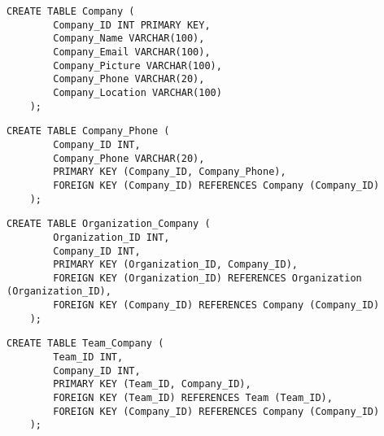     \begin{lstlisting}[caption={Create Company table}, label={lst:create_company}]
    CREATE TABLE Company (
        Company_ID INT PRIMARY KEY,
        Company_Name VARCHAR(100),
        Company_Email VARCHAR(100),
        Company_Picture VARCHAR(100),
        Company_Phone VARCHAR(20),
        Company_Location VARCHAR(100)
    );
    \end{lstlisting}
    
    \begin{lstlisting}[caption={Create Company Phone table}, label={lst:create_company_phone}]
    CREATE TABLE Company_Phone (
        Company_ID INT,
        Company_Phone VARCHAR(20),
        PRIMARY KEY (Company_ID, Company_Phone),
        FOREIGN KEY (Company_ID) REFERENCES Company (Company_ID)
    );
    \end{lstlisting}
    
    \begin{lstlisting}[caption={Create Organization Company table}, label={lst:create_organization_company}]
    CREATE TABLE Organization_Company (
        Organization_ID INT,
        Company_ID INT,
        PRIMARY KEY (Organization_ID, Company_ID),
        FOREIGN KEY (Organization_ID) REFERENCES Organization (Organization_ID),
        FOREIGN KEY (Company_ID) REFERENCES Company (Company_ID)
    );
    \end{lstlisting}
    
    \begin{lstlisting}[caption={Create Team Company table}, label={lst:create_team_company}]
    CREATE TABLE Team_Company (
        Team_ID INT,
        Company_ID INT,
        PRIMARY KEY (Team_ID, Company_ID),
        FOREIGN KEY (Team_ID) REFERENCES Team (Team_ID),
        FOREIGN KEY (Company_ID) REFERENCES Company (Company_ID)
    );
    \end{lstlisting}
    